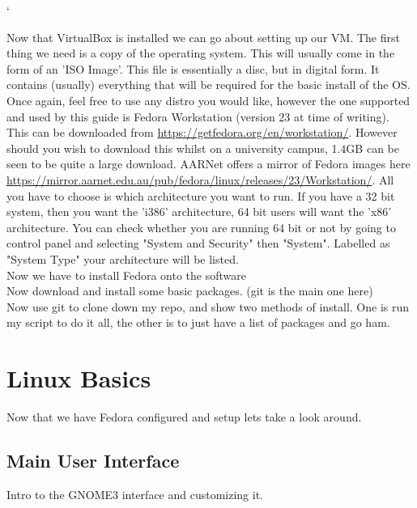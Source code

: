 `\documentclass[a4paper,11pt]{report}
\begin{document}
    Now that VirtualBox is installed we can go about setting up our VM.
		The first thing we need is a copy of the operating system.
		This will usually come in the form of an 'ISO Image'.
		This file is essentially a disc, but in digital form.
    It contains (usually) everything that will be required for the basic install of the OS.
		Once again, feel free to use any distro you would like, however the one supported and used by this guide is Fedora Workstation (version 23 at time of writing).
    This can be downloaded from \url{https://getfedora.org/en/workstation/}.
		However should you wish to download this whilst on a university campus, 1.4GB can be seen to be quite a large download.
		AARNet offers a mirror of Fedora images here \url{https://mirror.aarnet.edu.au/pub/fedora/linux/releases/23/Workstation/}.
    All you have to choose is which architecture you want to run.
		If you have a 32 bit system, then you want the 'i386' architecture, 64 bit users will want the 'x86' architecture.
    You can check whether you are running 64 bit or not by going to control panel and selecting "System and Security" then "System".
		Labelled as "System Type" your architecture will be listed.\\

		Now we have to install Fedora onto the software\\

		Now download and install some basic packages. (git is the main one here)\\

		Now use git to clone down my repo, and show two methods of install. One is run my script to do it all, the other is to just have a list of packages and go ham.

	\section{Linux Basics}
		Now that we have Fedora configured and setup lets take a look around.

		\subsection{Main User Interface}
			Intro to the GNOME3 interface and customizing it.
\end{document}
